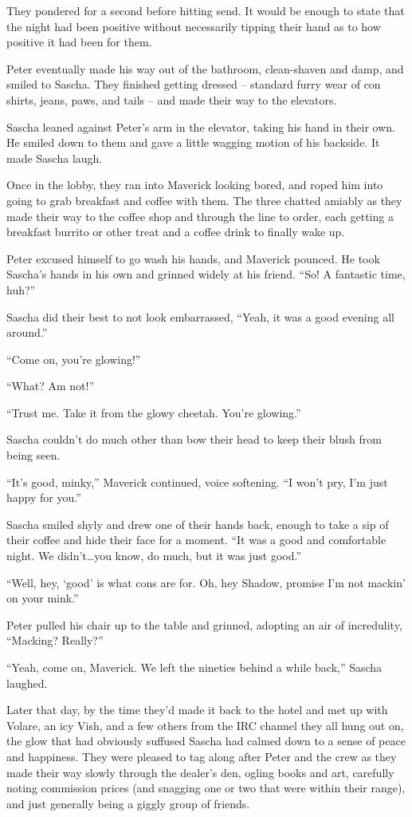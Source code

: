 They pondered for a second before hitting send. It would be enough to state that the night had been positive without necessarily tipping their hand as to how positive it had been for them.

Peter eventually made his way out of the bathroom, clean-shaven and damp, and smiled to Sascha. They finished getting dressed -- standard furry wear of con shirts, jeans, paws, and tails -- and made their way to the elevators.

Sascha leaned against Peter's arm in the elevator, taking his hand in their own. He smiled down to them and gave a little wagging motion of his backside. It made Sascha laugh.

Once in the lobby, they ran into Maverick looking bored, and roped him into going to grab breakfast and coffee with them. The three chatted amiably as they made their way to the coffee shop and through the line to order, each getting a breakfast burrito or other treat and a coffee drink to finally wake up.

Peter excused himself to go wash his hands, and Maverick pounced. He took Sascha's hands in his own and grinned widely at his friend. ``So! A fantastic time, huh?''

Sascha did their best to not look embarrassed, ``Yeah, it was a good evening all around.''

``Come on, you're glowing!''

``What? Am not!''

``Trust me. Take it from the glowy cheetah. You're glowing.''

Sascha couldn't do much other than bow their head to keep their blush from being seen.

``It's good, minky,'' Maverick continued, voice softening. ``I won't pry, I'm just happy for you.''

Sascha smiled shyly and drew one of their hands back, enough to take a sip of their coffee and hide their face for a moment. ``It was a good and comfortable night. We didn't\ldots{}you know, do much, but it was just good.''

``Well, hey, `good' is what cons are for. Oh, hey Shadow, promise I'm not mackin' on your mink.''

Peter pulled his chair up to the table and grinned, adopting an air of incredulity, ``Macking? Really?''

``Yeah, come on, Maverick. We left the nineties behind a while back,'' Sascha laughed.

Later that day, by the time they'd made it back to the hotel and met up with Volare, an icy Vish, and a few others from the IRC channel they all hung out on, the glow that had obviously suffused Sascha had calmed down to a sense of peace and happiness. They were pleased to tag along after Peter and the crew as they made their way slowly through the dealer's den, ogling books and art, carefully noting commission prices (and snagging one or two that were within their range), and just generally being a giggly group of friends.

